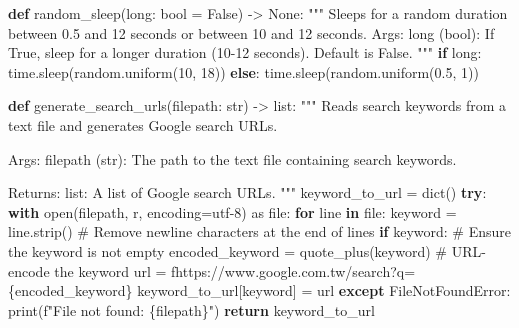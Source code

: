 \documentclass[
  titlepage]{article}
\newenvironment{Shaded}{\begin{snugshade}}{\end{snugshade}}
\newcommand{\BuiltInTok}[1]{\textcolor[rgb]{0.00,0.23,0.31}{#1}}
\newcommand{\CommentTok}[1]{\textcolor[rgb]{0.37,0.37,0.37}{#1}}
\newcommand{\ControlFlowTok}[1]{\textcolor[rgb]{0.00,0.23,0.31}{\textbf{#1}}}
\newcommand{\DecValTok}[1]{\textcolor[rgb]{0.68,0.00,0.00}{#1}}
\newcommand{\FloatTok}[1]{\textcolor[rgb]{0.68,0.00,0.00}{#1}}
\newcommand{\ImportTok}[1]{\textcolor[rgb]{0.00,0.46,0.62}{#1}}
\newcommand{\KeywordTok}[1]{\textcolor[rgb]{0.00,0.23,0.31}{\textbf{#1}}}
\newcommand{\NormalTok}[1]{\textcolor[rgb]{0.00,0.23,0.31}{#1}}
\newcommand{\OperatorTok}[1]{\textcolor[rgb]{0.37,0.37,0.37}{#1}}
\newcommand{\PreprocessorTok}[1]{\textcolor[rgb]{0.68,0.00,0.00}{#1}}
\newcommand{\SpecialCharTok}[1]{\textcolor[rgb]{0.37,0.37,0.37}{#1}}
\newcommand{\SpecialStringTok}[1]{\textcolor[rgb]{0.13,0.47,0.30}{#1}}
\newcommand{\StringTok}[1]{\textcolor[rgb]{0.13,0.47,0.30}{#1}}
\newcommand{\VariableTok}[1]{\textcolor[rgb]{0.07,0.07,0.07}{#1}}
\begin{document}
\begin{Shaded}
\begin{Highlighting}[]
\KeywordTok{def}\NormalTok{ random\_sleep(}\BuiltInTok{long}\NormalTok{: }\BuiltInTok{bool} \OperatorTok{=} \VariableTok{False}\NormalTok{) }\OperatorTok{{-}\textgreater{}} \VariableTok{None}\NormalTok{:}
    \CommentTok{"""}
\CommentTok{    Sleeps for a random duration between 0.5 and 12 seconds or between 10 and 12 seconds.}
\CommentTok{    Args:}
\CommentTok{        long (bool): If True, sleep for a longer duration (10{-}12 seconds). Default is False.}
\CommentTok{    """}
    \ControlFlowTok{if} \BuiltInTok{long}\NormalTok{:}
\NormalTok{        time.sleep(random.uniform(}\DecValTok{10}\NormalTok{, }\DecValTok{18}\NormalTok{))}
    \ControlFlowTok{else}\NormalTok{:}
\NormalTok{        time.sleep(random.uniform(}\FloatTok{0.5}\NormalTok{, }\DecValTok{1}\NormalTok{))}
\end{Highlighting}
\end{Shaded}

\begin{Shaded}
\begin{Highlighting}[]
\KeywordTok{def}\NormalTok{ generate\_search\_urls(filepath: }\BuiltInTok{str}\NormalTok{) }\OperatorTok{{-}\textgreater{}} \BuiltInTok{list}\NormalTok{:}
    \CommentTok{"""}
\CommentTok{    Reads search keywords from a text file and generates Google search URLs.}

\CommentTok{    Args:}
\CommentTok{        filepath (str): The path to the text file containing search keywords.}

\CommentTok{    Returns:}
\CommentTok{        list: A list of Google search URLs.}
\CommentTok{    """}
\NormalTok{    keyword\_to\_url }\OperatorTok{=} \BuiltInTok{dict}\NormalTok{()}
    \ControlFlowTok{try}\NormalTok{:}
        \ControlFlowTok{with} \BuiltInTok{open}\NormalTok{(filepath, }\StringTok{\textquotesingle{}r\textquotesingle{}}\NormalTok{, encoding}\OperatorTok{=}\StringTok{\textquotesingle{}utf{-}8\textquotesingle{}}\NormalTok{) }\ImportTok{as} \BuiltInTok{file}\NormalTok{:}
            \ControlFlowTok{for}\NormalTok{ line }\KeywordTok{in} \BuiltInTok{file}\NormalTok{:}
\NormalTok{                keyword }\OperatorTok{=}\NormalTok{ line.strip()  }\CommentTok{\# Remove newline characters at the end of lines}
                \ControlFlowTok{if}\NormalTok{ keyword:  }\CommentTok{\# Ensure the keyword is not empty}
\NormalTok{                    encoded\_keyword }\OperatorTok{=}\NormalTok{ quote\_plus(keyword)  }\CommentTok{\# URL{-}encode the keyword}
\NormalTok{                    url }\OperatorTok{=} \SpecialStringTok{f\textquotesingle{}https://www.google.com.tw/search?q=}\SpecialCharTok{\{}\NormalTok{encoded\_keyword}\SpecialCharTok{\}}\SpecialStringTok{\textquotesingle{}}
\NormalTok{                    keyword\_to\_url[keyword] }\OperatorTok{=}\NormalTok{ url}
    \ControlFlowTok{except} \PreprocessorTok{FileNotFoundError}\NormalTok{:}
        \BuiltInTok{print}\NormalTok{(}\SpecialStringTok{f"File not found: }\SpecialCharTok{\{}\NormalTok{filepath}\SpecialCharTok{\}}\SpecialStringTok{"}\NormalTok{)}
    \ControlFlowTok{return}\NormalTok{ keyword\_to\_url}
\end{Highlighting}
\end{Shaded}
\end{document}
